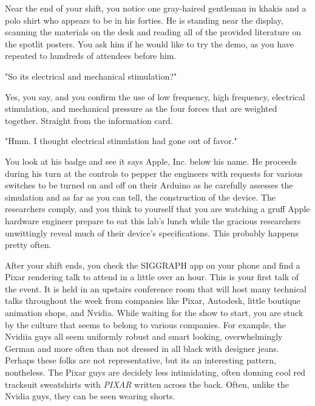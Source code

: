 \documentclass[../main.tex]{subfiles}
\begin{document}
Near the end of your shift, you notice one gray-haired gentleman in khakis and a polo shirt who appears to be in his forties. He is standing near the display, scanning the materials on the desk and reading all of the provided literature on the spotlit posters. You ask him if he would like to try the demo, as you have repeated to hundreds of attendees before him.

"So its electrical and mechanical stimulation?"

Yes, you say, and you confirm the use of low frequency, high frequency, electrical stimulation, and mechanical pressure as the four forces that are weighted together. Straight from the information card.

"Hmm. I thought electrical stimulation had gone out of favor."

You look at his badge and see it says Apple, Inc. below his name. He proceeds during his turn at the controls to pepper the engineers with requests for various switches to be turned on and off on their Arduino as he carefully assesses the simulation and as far as you can tell, the construction of the device.  The researchers comply, and you think to yourself that you are watching a gruff Apple hardware engineer prepare to eat this lab's lunch while the gracious researchers unwittingly reveal much of their device's specifications. This probably happens pretty often.

After your shift ends, you check the SIGGRAPH app on your phone and find a Pixar rendering talk to attend in a little over an hour. This is your first talk of the event. It is held in an upstairs conference room that will host many technical talks throughout the week from companies like Pixar, Autodesk, little boutique animation shops, and Nvidia. While waiting for the show to start, you are stuck by the culture that seems to belong to various companies. For example, the Nvidiia guys all seem uniformly robust and smart looking, overwhelmingly German and more often than not dressed in all black with designer jeans. Perhaps these folks are not representative, but its an interesting pattern, nontheless. The Pixar guys are decidely less intimidating, often donning cool red tracksuit sweatshirts with \textit{PIXAR} written across the back. Often, unlike the Nvidia guys, they can be seen wearing shorts.
\end{document}
